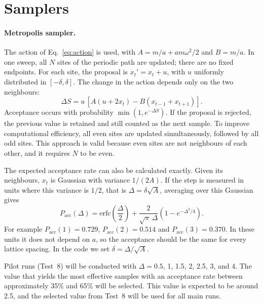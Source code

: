 \documentclass[11pt]{article}
\begin{document}
\section{Samplers}
\paragraph{Metropolis sampler.} The action of Eq.~\eqref{eq:action} is used, with $A = m/a + am\omega^2/2$ and $B = m/a$. In one sweep, all $N$ sites of the periodic path are updated; there are no fixed endpoints. For each site, the proposal is $x_t' = x_t + u$, with $u$ uniformly distributed in $[-\delta, \delta]$. The change in the action depends only on the two neighbours:
\begin{equation}
  \Delta S = u\,[A(u + 2x_t) - B(x_{t-1}+x_{t+1})].
  \label{eq:dS}
\end{equation}
Acceptance occurs with probability $\min(1, e^{-\Delta S})$. If the proposal is rejected, the previous value is retained and still counted as the next sample. To improve computational efficiency, all even sites are updated simultaneously, followed by all odd sites. This approach is valid because even sites are not neighbours of each other, and it requires $N$ to be even.

The expected acceptance rate can also be calculated exactly. Given its neighbours, $x_t$ is Gaussian with variance $1/(2A)$. If the step is measured in units where this variance is $1/2$, that is $\Delta = \delta\sqrt{A}$, averaging over this Gaussian gives
\begin{equation}
  P_{\text{acc}}(\Delta) = \mathrm{erfc}\!\left(\frac\Delta 2\right) + \frac{2}{\sqrt\pi\,\Delta}\left(1 - e^{-\Delta^2/4}\right).
  \label{eq:acc}
\end{equation}
For example $P_{\text{acc}}(1) = 0.729$, $P_{\text{acc}}(2) = 0.514$ and $P_{\text{acc}}(3) = 0.370$. In these units it does not depend on $a$, so the acceptance should be the same for every lattice spacing. In the code we set $\delta = \Delta/\sqrt{A}$.

Pilot runs (Test~8) will be conducted with $\Delta = 0.5$, 1, 1.5, 2, 2.5, 3, and 4. The value that yields the most effective samples with an acceptance rate between approximately 35\% and 65\% will be selected. This value is expected to be around 2.5, and the selected value from Test~8 will be used for all main runs.
\end{document}
